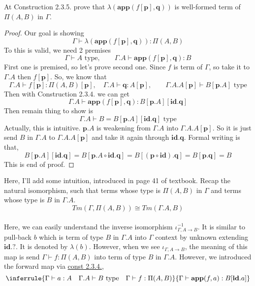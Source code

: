 \documentclass[12pt, a4paper, openany, twoside]{book}
\theoremstyle{definition}
\theoremstyle{remark}
\theoremstyle{plain}
\numberwithin{equation}{section}
\begin{document}
\begin{tcolorbox}[breakable, colback=yellow!10!white,colframe=brown!75!black,title=Exercise 2.7.]
At Construction 2.3.5. prove that $\lambda(\textbf{app}(f[\mathbf{p}], \mathbf{q}))$ is well-formed term of $\Pi(A, B)$ in $\Gamma$. 
\begin{proof}
    Our goal is showing 
    \[\Gamma \vdash \lambda(\textbf{app}(f[\textbf{p}], \textbf{q})) : \Pi(A, B)\]
    To this is valid, we need 2 premises 
    \[\Gamma \vdash A \text{ type}, \qquad \Gamma.A \vdash \textbf{app}(f[\textbf{p}], \textbf{q}) : B\]
    First one is premised, so let's prove second one. Since $f$ is term of $\Gamma$, so take it to $\Gamma.A$ then $f[\textbf{p}]$. So, 
    we know that 
    \[\Gamma.A \vdash f[\textbf{p}] : \Pi(A, B)[\textbf{p}], \quad \Gamma.A \vdash \textbf{q} : A[\textbf{p}], \qquad \Gamma.A.A[\textbf{p}] \vdash B[\textbf{p}.A] \text{ type}\]
    Then with Construction 2.3.4. we can get 
    \[\Gamma.A \vdash \textbf{app}(f[\textbf{p}], \textbf{q}) : B[\textbf{p}.A][\textbf{id.q}]\]
    Then remain thing to show is 
    \[\Gamma.A \vdash B = B[\textbf{p}.A][\textbf{id.q}] \text{ type}\]
    Actually, this is intuitive. $\textbf{p}.A$ is weakening from $\Gamma.A$ into $\Gamma.A.A[\textbf{p}]$. So it is just 
    send $B$ in $\Gamma.A$ to $\Gamma.A.A[\textbf{p}]$ and take it again through $\textbf{id.q}$. Formal writing is that, 
    \[B[\textbf{p}.A][\textbf{id.q}] = B[\textbf{p}.A \circ \textbf{id.q}] = B[(\textbf{p}\circ \textbf{id}).\textbf{q}] = B[\textbf{p.q}] = B\]
    This is end of proof. 
\end{proof}
\end{tcolorbox}
Here, I'll add some intuition, introduced in page 41 of textbook. Recap the natural isomorphism, 
such that terms whose type is $\Pi(A, B)$ in $\Gamma$ and terms whose type is $B$ in $\Gamma.A$. 
\[Tm(\Gamma, \Pi(A, B)) \cong Tm(\Gamma.A, B)\]
\\
Here, we can easily understand the inverse isomorphism $\iota^{-1}_{\Gamma, A\rightarrow B}$. It is 
similar to pull-back $b$ which is term of type $B$ in $\Gamma.A$ into $\Gamma$ context by unknown extending $\mathbf{id}.?$. 
It is denoted by $\lambda(b)$. However, when we see $\iota_{\Gamma, A \rightarrow B}$, the meaning of this 
map is send $\Gamma \vdash f : \Pi(A, B)$ into term of type $B$ in $\Gamma.A$. However, we introduced the forward map via \hyperlink{const 2.3.4.}{const 2.3.4.}, 
\[
\inferrule
{
    \Gamma \vdash a : A \quad \Gamma.A \vdash B \text{ type} \quad \Gamma \vdash f : \Pi(A, B)
}
{
    \Gamma \vdash \mathbf{app}(f, a) : B[\mathbf{id}.a]
}
\]
\end{document}

